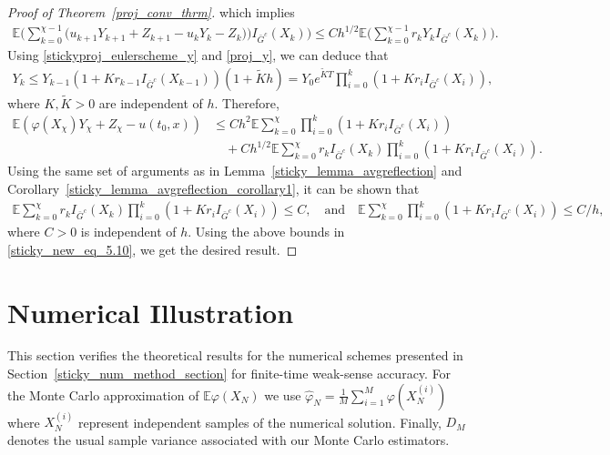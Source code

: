 \documentclass{article}
\theoremstyle{definition}
\numberwithin{equation}{section}
\begin{document}
\begin{proof}[Proof of Theorem~\ref{proj_conv_thrm}]
which implies
\begin{align}
 \mathbb{E}\Big(\sum\limits_{k=0}^{\chi -1 }\big(u_{k+1}Y_{k+1} + Z_{k+1} - u_{k}Y_{k} - Z_{k})\big)I_{\bar{G}^{c}}(X_{k})\Big) \leq  Ch^{1/2}\mathbb{E}\Big(\sum\limits_{k=0}^{\chi - 1}r_{k}Y_{k}I_{\bar{G}^{c}}(X_{k})\Big). 
\end{align}
Using \eqref{stickyproj_eulerscheme_y} and \eqref{proj_y}, we can deduce that
\begin{align*}
    Y_{k} \leq  Y_{k-1}(1 + K r_{k-1}I_{\bar{G}^c}(X_{k-1}))(1+ \tilde{K}h)  = Y_{0}e^{\tilde{K} T}\prod\limits_{i=0}^{k}(1 + K r_{i} I_{\bar{G}^c}(X_{i})),
\end{align*}
where $K, \tilde{K}>0$ are independent of $ h$.  Therefore,
\begin{align}
\mathbb{E}(\varphi(X_{\chi})Y_{\chi}  + Z_{\chi} - u(t_{0}, x)) &\leq Ch^{2} \mathbb{E}\sum_{k=0}^{\chi}\prod\limits_{i=0}^{k}(1 + K r_{i} I_{\bar{G}^c}(X_{i}))  
\nonumber \\   & \quad 
+ Ch^{1/2} \mathbb{E}\sum_{k=0}^{\chi}r_{k}I_{\bar{G}^{c}}(X_{k})\prod\limits_{i=0}^{k}(1 + K r_{i} I_{\bar{G}^c}(X_{i})). \label{sticky_new_eq_5.10}
\end{align}
Using the same set of arguments as in Lemma~\ref{sticky_lemma_avgreflection} and Corollary~\ref{sticky_lemma_avgreflection_corollary1}, it can be shown that
\begin{align*} 
\mathbb{E}\sum_{k=0}^{\chi}r_{k}I_{\bar{G}^{c}}(X_{k})\prod\limits_{i=0}^{k}(1 + K r_{i} I_{\bar{G}^c}(X_{i})) \leq C, \quad \text{and}\quad \mathbb{E}\sum_{k=0}^{\chi}\prod\limits_{i=0}^{k}(1 + K r_{i} I_{\bar{G}^c}(X_{i})) \leq C/h, 
\end{align*}
where $ C >0 $ is independent of $h$. Using the above bounds in \eqref{sticky_new_eq_5.10}, we get the desired result. 
\end{proof}




\section{Numerical Illustration}\label{sticky_sec_num_exp}

This section verifies the theoretical results for the numerical schemes presented in Section~\ref{sticky_num_method_section}   for finite-time weak-sense accuracy. 
 For the Monte Carlo approximation of $\mathbb{E}\varphi(X_{N})$ we use $\hat{\varphi}_{N} = \frac{1}{M}\sum_{i=1}^{M} \varphi(X^{(i)}_{N})$ where $X^{(i)}_{N}$ represent
 independent samples of the numerical solution.  Finally, ${D}_{M}$
denotes the usual sample variance associated with our Monte Carlo estimators. 
\end{document}
